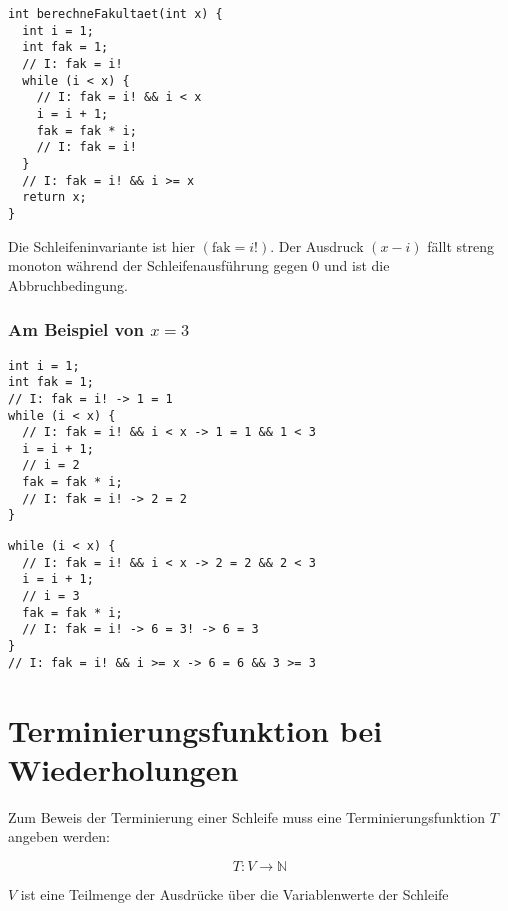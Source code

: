 \documentclass{bschlangaul-haupt}
\begin{document}
\begin{verbatim}
int berechneFakultaet(int x) {
  int i = 1;
  int fak = 1;
  // I: fak = i!
  while (i < x) {
    // I: fak = i! && i < x
    i = i + 1;
    fak = fak * i;
    // I: fak = i!
  }
  // I: fak = i! && i >= x
  return x;
}
\end{verbatim}

\noindent
Die Schleifeninvariante ist hier $(\text{fak} = i!)$. Der Ausdruck $(x -
i)$ fällt streng monoton während der Schleifenausführung gegen $0$ und
ist die Abbruchbedingung.

\subsubsection{Am Beispiel von $x = 3$}

\begin{multicols}{2}

\begin{verbatim}
int i = 1;
int fak = 1;
// I: fak = i! -> 1 = 1
while (i < x) {
  // I: fak = i! && i < x -> 1 = 1 && 1 < 3
  i = i + 1;
  // i = 2
  fak = fak * i;
  // I: fak = i! -> 2 = 2
}
\end{verbatim}


\begin{verbatim}
while (i < x) {
  // I: fak = i! && i < x -> 2 = 2 && 2 < 3
  i = i + 1;
  // i = 3
  fak = fak * i;
  // I: fak = i! -> 6 = 3! -> 6 = 3
}
// I: fak = i! && i >= x -> 6 = 6 && 3 >= 3
\end{verbatim}

\end{multicols}

%

\section{Terminierungsfunktion bei Wiederholungen}

Zum Beweis der Terminierung einer Schleife muss eine
Terminierungsfunktion $T$ angeben werden:

\begin{displaymath}
T \colon V \rightarrow \mathbb{N}
\end{displaymath}

\noindent
$V$ ist eine Teilmenge der Ausdrücke über die Variablenwerte der Schleife
\end{document}
